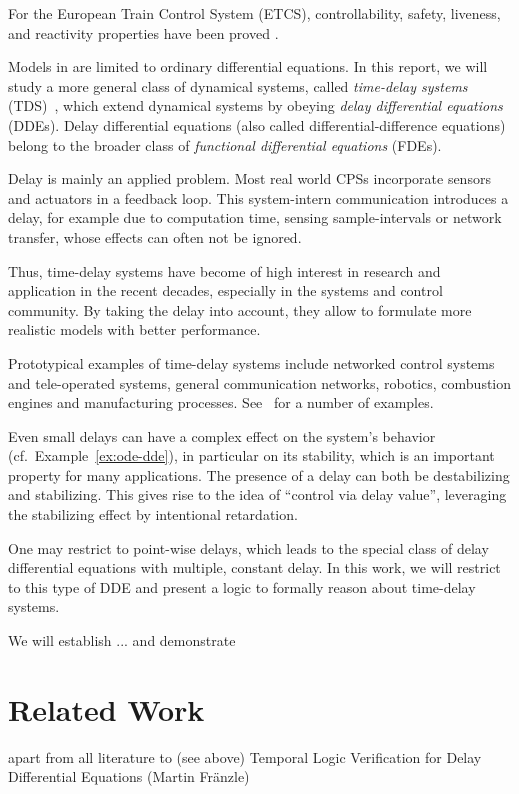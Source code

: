     For the European Train Control System (ETCS), controllability, safety, liveness, and reactivity properties have been proved \cite{Platzer09ETCS}.

    

    Models in \dL are limited to ordinary differential equations.
    In this report, we will study a more general class of dynamical systems, called \emph{time-delay systems} (TDS)~\cite{Richard2003TDSs}, which extend dynamical systems by obeying \emph{delay differential equations} (DDEs). Delay differential equations (also called differential-difference equations) belong to the broader class of \emph{functional differential equations} (FDEs).

    Delay is mainly an applied problem. Most real world CPSs incorporate
    sensors and actuators in a feedback loop. This system-intern communication introduces a delay, for example due to computation time, sensing sample-intervals or network transfer, whose effects can often not be ignored.

    Thus, time-delay systems have become of high interest in research and application in the recent decades, especially in the systems and control community. By taking the delay into account, they allow to formulate more realistic models with better performance.
    
    Prototypical examples of time-delay systems include networked control systems and tele-operated systems, general communication networks, robotics, combustion engines and manufacturing processes. See~\cite{Gu03TimeDelaySys} for a number of examples.

    Even small delays can have a complex effect on the system's behavior (cf.\ Example~\ref{ex:ode-dde}), in particular on its stability, which is an important property for many applications.
    The presence of a delay can both be destabilizing and stabilizing.
    This gives rise to the idea of ``control via delay value'', leveraging the stabilizing effect by intentional retardation.
    


    One may restrict to point-wise delays, which leads to the special class of delay differential equations with multiple, constant delay.
    In this work, we will restrict to this type of DDE and present a logic to formally reason about time-delay systems.

    We will establish ...
    and demonstrate


    \section{Related Work}
        apart from all literature to \dL (see above)
        \cite{Huang16BoundedVerificationNNDS}
        Temporal Logic Verification for Delay Differential Equations (Martin Fränzle)

